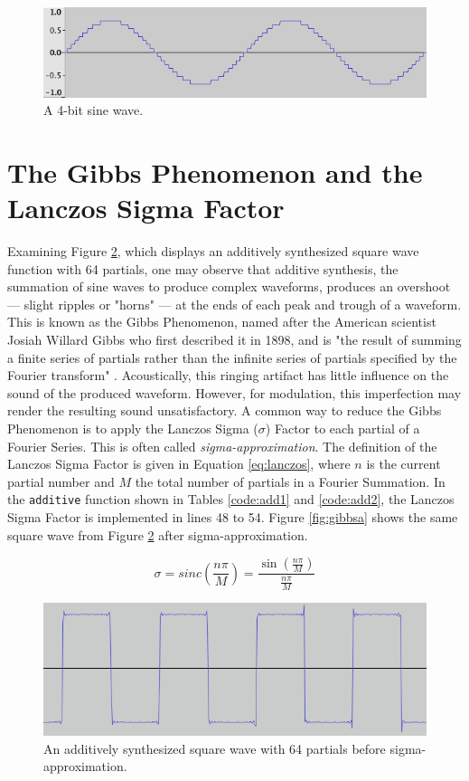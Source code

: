 \documentclass[12pt,twoside]{report}
\begin{document}
\begin{figure}[th!]
  \includegraphics[scale=0.5]{img/sine4}
  \caption{A 4-bit sine wave.}
  \label{fig:sine4}
\end{figure}

\pagebreak

\section{The Gibbs Phenomenon and the Lanczos Sigma Factor}

Examining Figure \ref{fig:gibbsb}, which displays an additively synthesized square wave function with 64 partials, one may observe that additive synthesis, the summation of sine waves to produce complex waveforms, produces an overshoot --- slight ripples or "horns" --- at the ends of each peak and trough of a waveform. This is known as the Gibbs Phenomenon, named after the American scientist Josiah Willard Gibbs who first described it in 1898, and is "the result of summing a finite series of partials rather than the infinite series of partials specified by the Fourier transform" . Acoustically, this ringing artifact has little influence on the sound of the produced waveform. However, for modulation, this imperfection may render the resulting sound unsatisfactory. A common way to reduce the Gibbs Phenomenon is to apply the Lanczos Sigma ($\sigma$) Factor to each partial of a Fourier Series. This is often called \emph{sigma-approximation}. The definition of the Lanczos Sigma Factor is given in Equation \ref{eq:lanczos}, where $n$ is the current partial number and $M$ the total number of partials in a Fourier Summation. In the \texttt{additive} function shown in Tables \ref{code:add1} and \ref{code:add2}, the Lanczos Sigma Factor is implemented in lines 48 to 54. Figure \ref{fig:gibbsa} shows the same square wave from Figure \ref{fig:gibbsb} after sigma-approximation.

\begin{equation}
  \sigma = sinc(\frac{n\pi}{M}) = \frac{\sin(\frac{n\pi}{M})}{\frac{n\pi}{M}}
  \label{eq:lanczos}
\end{equation}

\begin{figure}
  \includegraphics[scale=0.5]{img/gibbsb}
  \caption{An additively synthesized square wave with 64 partials before sigma-approximation.}
  \label{fig:gibbsb}
\end{figure}
\end{document}
